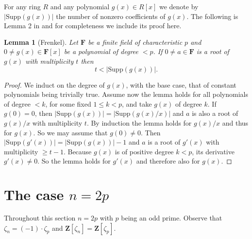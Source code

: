 \documentclass[10pt,a4paper]{amsart}
\newtheorem{lemma}[theorem]{Lemma}
\def\Z{\mathbf{Z}}
\def\F{\mathbf{F}}
\def\Supp{\mathrm{Supp}}
\begin{document}
For any ring  $R$ and  any polynomial $g(x) \in R[x]$ 
we denote by $|\Supp(g(x))|$ the number of nonzero coefficients of $g(x)$. 
The following is Lemma 2 in \cite{Frenkel} and  for completeness we include its proof here.  
\begin{lemma}[Frenkel]\label{Lem:Frenkel}
Let  $ \F$ be a finite field of characteristic $p$ and    $0 \neq g(x) \in  \F[x]$  be a polynomial of degree $<p$. If $0 \neq a \in \F$ is a root of $g(x) $ with multiplicity $t$ then 
\[
t< |\Supp(g(x))|.
\]
\end{lemma}


\begin{proof}
We induct on the degree of $g(x)$,  with the base case, that of  constant polynomials being trivially true. 
Assume now the lemma holds for all polynomials of degree $<k$, for some fixed $1 \leq k <p$, and take $g(x)$ of degree $k$. If $g(0)= 0 $, then $|\Supp(g(x))|= |\Supp(g(x)/x)|$  and  $a$ is also a root of $g(x)/x$ with multiplicity $t$. By induction the lemma holds for $g(x)/x$ and thus for $g(x)$. So we may assume that $g(0) \neq 0 $. Then $|\Supp(g'(x))| = |\Supp(g(x))|-1$ and $a$ is a root of $g'(x)$ with multiplicity $\geq t-1$.
Because $g(x)$ is of positive degree $k < p$, its derivative  $g'(x) \neq 0$. So the lemma holds for $g'(x)$ and therefore also for $g(x)$. 
\end{proof}

\section{The case $n=2p$ }\label{Sec:n=2p}

Throughout this  section $n=2p$ with  $p$ being an odd prime. Observe that   $\zeta_n= (-1) \cdot \zeta_p$ and $\Z[\zeta_n]=\Z[\zeta_p]$. 
\end{document}
